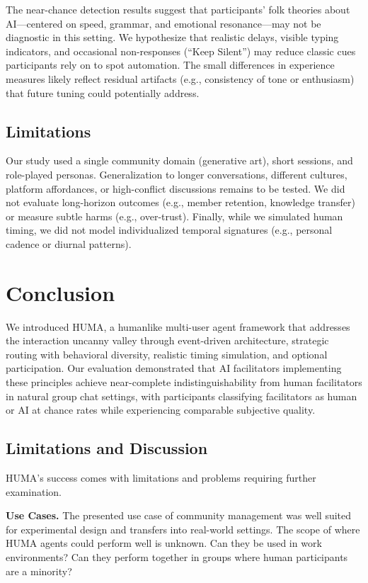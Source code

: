 \documentclass[twocolumn,10pt]{article}
\begin{document}
The near-chance detection results suggest that participants' folk theories about AI—centered on speed, grammar, and emotional resonance—may not be diagnostic in this setting. We hypothesize that realistic delays, visible typing indicators, and occasional non-responses (``Keep Silent'') may reduce classic cues participants rely on to spot automation. The small differences in experience measures likely reflect residual artifacts (e.g., consistency of tone or enthusiasm) that future tuning could potentially address.

\subsection{Limitations}

Our study used a single community domain (generative art), short sessions, and role-played personas. Generalization to longer conversations, different cultures, platform affordances, or high-conflict discussions remains to be tested. We did not evaluate long-horizon outcomes (e.g., member retention, knowledge transfer) or measure subtle harms (e.g., over-trust). Finally, while we simulated human timing, we did not model individualized temporal signatures (e.g., personal cadence or diurnal patterns).


\section{Conclusion}
\label{sec:conclusion}

We introduced HUMA, a humanlike multi-user agent framework that addresses the interaction uncanny valley through event-driven architecture, strategic routing with behavioral diversity, realistic timing simulation, and optional participation. Our evaluation demonstrated that AI facilitators implementing these principles achieve near-complete indistinguishability from human facilitators in natural group chat settings, with participants classifying facilitators as human or AI at chance rates while experiencing comparable subjective quality.

\subsection{Limitations and Discussion}

HUMA's success comes with limitations and problems requiring further examination.

\textbf{Use Cases.} The presented use case of community management was well suited for experimental design and transfers into real-world settings. The scope of where HUMA agents could perform well is unknown. Can they be used in work environments? Can they perform together in groups where human participants are a minority?
\end{document}
